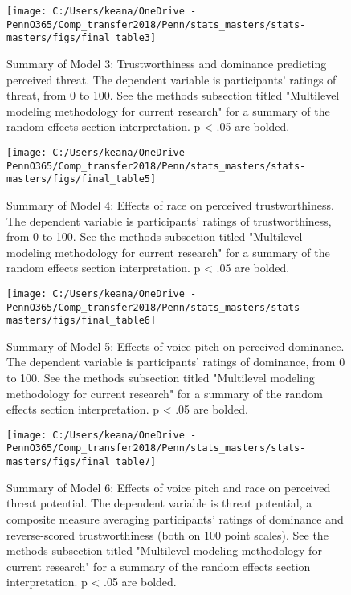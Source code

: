 \documentclass[
  english,
  man, noextraspace,floatsintext]{apa6}
\begin{document}
\begin{figure}

{\centering \texttt{[image: C:/Users/keana/OneDrive - PennO365/Comp\_transfer2018/Penn/stats\_masters/stats-masters/figs/final\_table3]} 

}

\caption{Summary of Model 3: Trustworthiness and dominance predicting perceived threat. The dependent variable is participants' ratings of threat, from 0 to 100. See the methods subsection titled "Multilevel modeling methodology for current research" for a summary of the random effects section interpretation. p < .05 are bolded.}\label{fig:f7}
\end{figure}

\begin{figure}

{\centering \texttt{[image: C:/Users/keana/OneDrive - PennO365/Comp\_transfer2018/Penn/stats\_masters/stats-masters/figs/final\_table5]} 

}

\caption{Summary of Model 4: Effects of race on perceived trustworthiness. The dependent variable is participants' ratings of trustworthiness, from 0 to 100. See the methods subsection titled "Multilevel modeling methodology for current research" for a summary of the random effects section interpretation. p < .05 are bolded.}\label{fig:f8}
\end{figure}

\begin{figure}

{\centering \texttt{[image: C:/Users/keana/OneDrive - PennO365/Comp\_transfer2018/Penn/stats\_masters/stats-masters/figs/final\_table6]} 

}

\caption{Summary of Model 5: Effects of voice pitch on perceived dominance. The dependent variable is participants' ratings of dominance, from 0 to 100. See the methods subsection titled "Multilevel modeling methodology for current research" for a summary of the random effects section interpretation. p < .05 are bolded.}\label{fig:f9}
\end{figure}

\begin{figure}

{\centering \texttt{[image: C:/Users/keana/OneDrive - PennO365/Comp\_transfer2018/Penn/stats\_masters/stats-masters/figs/final\_table7]} 

}

\caption{Summary of Model 6: Effects of voice pitch and race on perceived threat potential. The dependent variable is threat potential, a composite measure averaging participants' ratings of dominance and reverse-scored trustworthiness (both on 100 point scales). See the methods subsection titled "Multilevel modeling methodology for current research" for a summary of the random effects section interpretation. p < .05 are bolded.}\label{fig:f10}
\end{figure}
\end{document}
